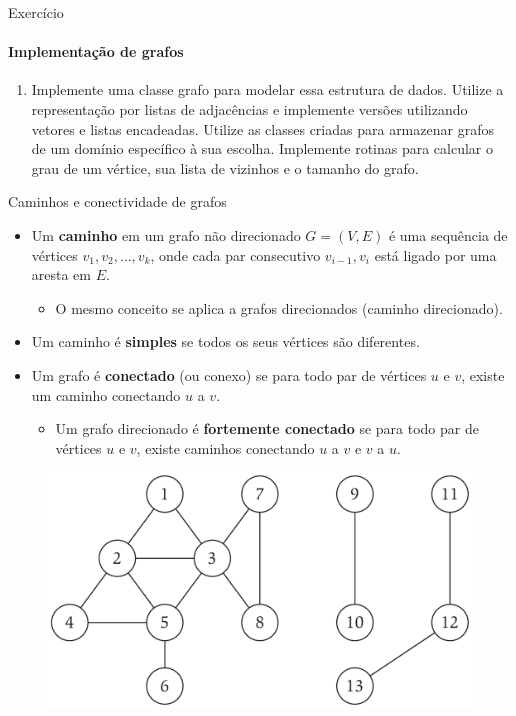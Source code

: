 \begin{frame}{Exercício}
	\framesubtitle{Implementação de grafos}
	
	\begin{enumerate}
		\item Implemente uma classe grafo para modelar essa estrutura de dados. Utilize a representação por listas de adjacências e implemente versões utilizando vetores e listas encadeadas. Utilize as classes criadas para armazenar grafos de um domínio específico à sua escolha. Implemente rotinas para calcular o grau de um vértice, sua lista de vizinhos e o tamanho do grafo.
	\end{enumerate}
\end{frame}



\begin{frame}{Caminhos e conectividade de grafos}
	
	\begin{itemize}
		\item Um \textbf{\color{magenta}caminho} em um grafo não direcionado $G = (V, E)$ é uma sequência de vértices $v_1, v_2, \dots, v_k$, onde cada par consecutivo $v_{i-1}, v_i$ está ligado por uma aresta em $E$.
		\begin{itemize}
			\item O mesmo conceito se aplica a grafos direcionados (caminho direcionado).
		\end{itemize}
		
		\item Um caminho é \textbf{simples} se todos os seus vértices são diferentes.
		
		\pause
		\item Um grafo é \textbf{\color{magenta}conectado} (ou conexo) se para todo par de vértices $u$ e $v$, existe um caminho conectando $u$ a $v$.
		\begin{itemize}
			\item Um grafo direcionado é \textbf{fortemente conectado} se para todo par de vértices $u$ e $v$, existe caminhos conectando $u$ a $v$ e $v$ a $u$.
		\end{itemize}
	\end{itemize}

	\pause
	\begin{figure}
		\centering
		\includegraphics[width=0.55\linewidth]{img/conectividade}
	\end{figure}
\end{frame}



